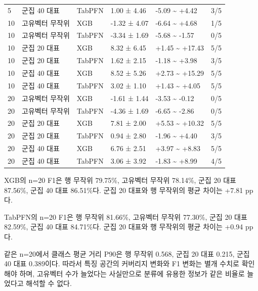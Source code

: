 \begin{longtable}
{}5 & 군집 40 대표 & TabPFN & 1.00 ± 4.46 & -5.09 \textasciitilde{} +\allowbreak{}4.42 & 3/\allowbreak{}5 \\
{}10 & 고유벡터 무작위 & XGB & -1.32 ± 4.07 & -6.64 \textasciitilde{} +\allowbreak{}4.68 & 1/\allowbreak{}5 \\
{}10 & 고유벡터 무작위 & TabPFN & -3.34 ± 1.69 & -5.68 \textasciitilde{} -1.57 & 0/\allowbreak{}5 \\
{}10 & 군집 20 대표 & XGB & 8.32 ± 6.45 & +\allowbreak{}1.45 \textasciitilde{} +\allowbreak{}17.43 & 5/\allowbreak{}5 \\
{}10 & 군집 20 대표 & TabPFN & 1.62 ± 2.15 & -1.18 \textasciitilde{} +\allowbreak{}3.98 & 3/\allowbreak{}5 \\
{}10 & 군집 40 대표 & XGB & 8.52 ± 5.26 & +\allowbreak{}2.73 \textasciitilde{} +\allowbreak{}15.29 & 5/\allowbreak{}5 \\
{}10 & 군집 40 대표 & TabPFN & 3.02 ± 1.10 & +\allowbreak{}1.43 \textasciitilde{} +\allowbreak{}4.05 & 5/\allowbreak{}5 \\
{}20 & 고유벡터 무작위 & XGB & -1.61 ± 1.44 & -3.53 \textasciitilde{} -0.12 & 0/\allowbreak{}5 \\
{}20 & 고유벡터 무작위 & TabPFN & -4.36 ± 1.69 & -6.65 \textasciitilde{} -2.86 & 0/\allowbreak{}5 \\
{}20 & 군집 20 대표 & XGB & 7.81 ± 2.00 & +\allowbreak{}5.53 \textasciitilde{} +\allowbreak{}10.32 & 5/\allowbreak{}5 \\
{}20 & 군집 20 대표 & TabPFN & 0.94 ± 2.80 & -1.96 \textasciitilde{} +\allowbreak{}4.40 & 3/\allowbreak{}5 \\
{}20 & 군집 40 대표 & XGB & 6.76 ± 2.51 & +\allowbreak{}3.97 \textasciitilde{} +\allowbreak{}8.83 & 5/\allowbreak{}5 \\
{}20 & 군집 40 대표 & TabPFN & 3.06 ± 3.92 & -1.83 \textasciitilde{} +\allowbreak{}8.99 & 4/\allowbreak{}5 \\
\bottomrule
\end{longtable}
\endgroup
XGB의 n=\allowbreak{}20 F1은 행 무작위 79.75\%, 고유벡터 무작위 78.14\%, 군집 20 대표 87.56\%, 군집 40 대표 86.51\%다. 군집 20 대표와 행 무작위의 평균 차이는 +\allowbreak{}7.81 pp다.

TabPFN의 n=\allowbreak{}20 F1은 행 무작위 81.66\%, 고유벡터 무작위 77.30\%, 군집 20 대표 82.59\%, 군집 40 대표 84.71\%다. 군집 20 대표와 행 무작위의 평균 차이는 +\allowbreak{}0.94 pp다.

같은 n=\allowbreak{}20에서 클래스 평균 거리 P90은 행 무작위 0.568, 군집 20 대표 0.215, 군집 40 대표 0.389이다. 따라서 특징 공간의 커버리지 변화와 F1 변화는 별개 수치로 확인해야 하며, 고유벡터 수가 늘었다는 사실만으로 분류에 유용한 정보가 같은 비율로 늘었다고 해석할 수 없다.

